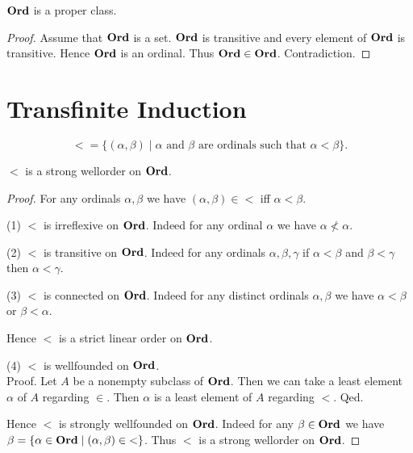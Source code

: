 \documentclass[10pt]{article}
\begin{document}
  \begin{forthel}
    \begin{theorem}
      $\textbf{Ord}$ is a proper class.
    \end{theorem}
    \begin{proof}
      Assume that $\textbf{Ord}$ is a set.
      $\textbf{Ord}$ is transitive and every element of $\textbf{Ord}$ is transitive.
      Hence $\textbf{Ord}$ is an ordinal.
      Thus $\textbf{Ord} \in \textbf{Ord}$.
      Contradiction.
    \end{proof}
  \end{forthel}


  \section{Transfinite Induction}

  \begin{forthel}
    \begin{definition}
      \[ {<} = \{ (\alpha, \beta) \mid \text{$\alpha$ and $\beta$ are ordinals
      such that $\alpha < \beta$} \}. \]
    \end{definition}
  \end{forthel}

  \begin{forthel}
    \begin{proposition}
      ${<}$ is a strong wellorder on $\textbf{Ord}$.
    \end{proposition}
    \begin{proof}
      For any ordinals $\alpha, \beta$ we have $(\alpha,\beta) \in {<}$ iff
      $\alpha < \beta$.

      (1) ${<}$ is irreflexive on $\textbf{Ord}$.
      Indeed for any ordinal $\alpha$ we have $\alpha \nless \alpha$.

      (2) ${<}$ is transitive on $\textbf{Ord}$.
      Indeed for any ordinals $\alpha, \beta, \gamma$ if $\alpha < \beta$ and
      $\beta < \gamma$ then $\alpha < \gamma$.

      (3) ${<}$ is connected on $\textbf{Ord}$.
      Indeed for any distinct ordinals $\alpha, \beta$ we have $\alpha < \beta$
      or $\beta < \alpha$.

      Hence ${<}$ is a strict linear order on $\textbf{Ord}$.

      (4) ${<}$ is wellfounded on $\textbf{Ord}$. \\
      Proof.
        Let $A$ be a nonempty subclass of $\textbf{Ord}$.
        Then we can take a least element $\alpha$ of $A$ regarding ${\in}$.
        Then $\alpha$ is a least element of $A$ regarding ${<}$.
      Qed.

      Hence ${<}$ is strongly wellfounded on $\textbf{Ord}$.
      Indeed for any $\beta \in \textbf{Ord}$ we have $\beta = \{ \alpha \in \textbf{Ord} \mid
      (\alpha,\beta) \in {<} \}$.
      Thus ${<}$ is a strong wellorder on $\textbf{Ord}$.
    \end{proof}
  \end{forthel}
\end{document}
